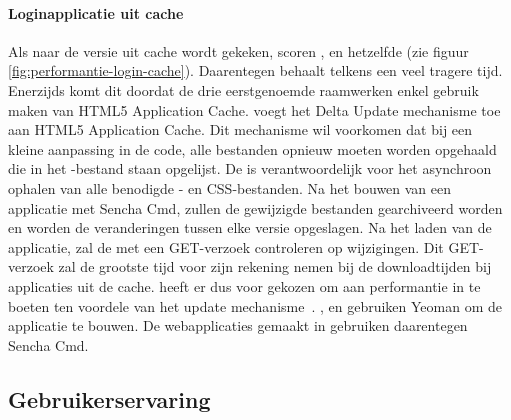 \paragraph{Loginapplicatie uit cache}
Als naar de versie uit cache wordt gekeken, scoren \kendo{}, \jqm{} en \lungo{} hetzelfde (zie figuur \ref{fig:performantie-login-cache}).
Daarentegen behaalt \st{} telkens een veel tragere tijd.
Enerzijds komt dit doordat de drie eerstgenoemde raamwerken enkel gebruik maken van HTML5 Application Cache.
\st{} voegt het Delta Update mechanisme toe aan HTML5 Application Cache.
Dit mechanisme wil voorkomen dat bij een kleine aanpassing in de code,  alle bestanden opnieuw moeten worden opgehaald die in het -bestand staan opgelijst.
De  is verantwoordelijk voor het asynchroon ophalen van alle benodigde \js{}- en CSS-bestanden.
Na het bouwen van een applicatie met Sencha Cmd,  zullen de gewijzigde bestanden gearchiveerd worden en worden de veranderingen tussen elke versie opgeslagen.
Na het laden van de applicatie, zal de  met een GET-verzoek controleren op wijzigingen.
Dit GET-verzoek zal de grootste tijd voor zijn rekening nemen bij de downloadtijden bij applicaties uit de cache.
\st{} heeft er dus voor gekozen om aan performantie in te boeten ten voordele van het update mechanisme~\cite{Nguyen2012}.
\kendo{}, \jqm{} en \lungo{} gebruiken Yeoman om de applicatie te bouwen.
De webapplicaties gemaakt in \st{} gebruiken daarentegen Sencha Cmd.


\subsection{Gebruikerservaring}
\label{sec:evaluatie-gebruikerservaring}

\begin{table}
\centering
{}
\caption{Gebruikerservaring van het scrollen door een lange lijst.}
\label{tabel:evaluatie-performantie-gebruikerservaring}
\end{table}

